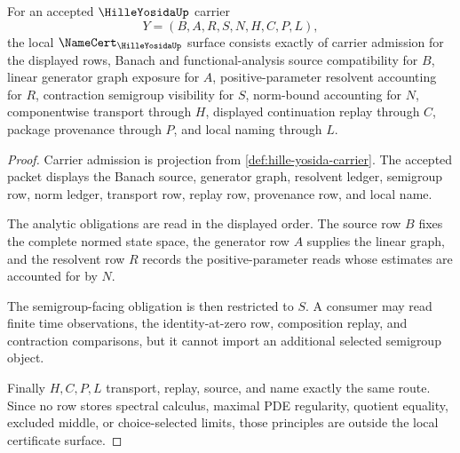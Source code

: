 \begin{theorem}
\label{thm:hille-yosida-namecert-obligations}
For an accepted $\HilleYosidaUp$ carrier
$$
Y=(B,A,R,S,N,H,C,P,L),
$$
the local $\NameCert_{\HilleYosidaUp}$ surface consists exactly of carrier admission for the displayed rows, Banach and functional-analysis source compatibility for $B$, linear generator graph exposure for $A$, positive-parameter resolvent accounting for $R$, contraction semigroup visibility for $S$, norm-bound accounting for $N$, componentwise transport through $H$, displayed continuation replay through $C$, package provenance through $P$, and local naming through $L$.
\end{theorem}
\begin{proof}
Carrier admission is projection from \autoref{def:hille-yosida-carrier}. The accepted packet displays the Banach source, generator graph, resolvent ledger, semigroup row, norm ledger, transport row, replay row, provenance row, and local name.

The analytic obligations are read in the displayed order. The source row $B$ fixes the complete normed state space, the generator row $A$ supplies the linear graph, and the resolvent row $R$ records the positive-parameter reads whose estimates are accounted for by $N$.

The semigroup-facing obligation is then restricted to $S$. A consumer may read finite time observations, the identity-at-zero row, composition replay, and contraction comparisons, but it cannot import an additional selected semigroup object.

Finally $H,C,P,L$ transport, replay, source, and name exactly the same route. Since no row stores spectral calculus, maximal PDE regularity, quotient equality, excluded middle, or choice-selected limits, those principles are outside the local certificate surface.
\end{proof}

